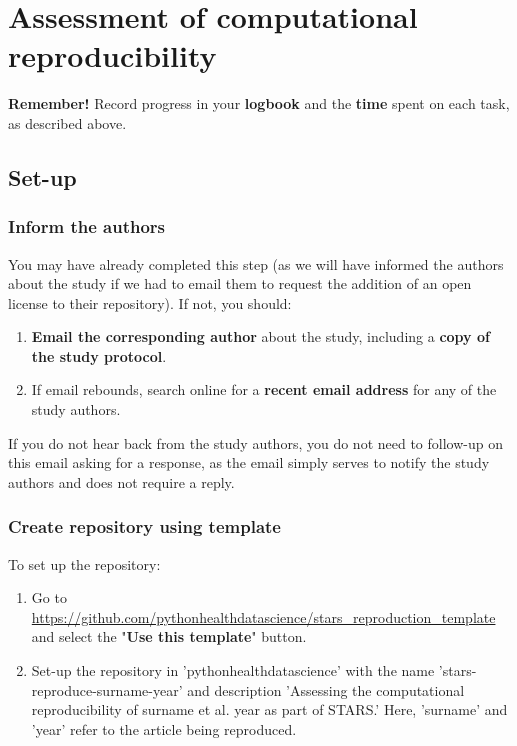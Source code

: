 \section{Assessment of computational reproducibility} \label{sec:reproduce}

\textbf{Remember!} Record progress in your \textbf{logbook} and the \textbf{time} spent on each task, as described above.

\vspace{0.5cm}
\subsection{Set-up}

\subsubsection{Inform the authors}

You may have already completed this step (as we will have informed the authors about the study if we had to email them to request the addition of an open license to their repository). If not, you should:
\begin{enumerate}
    \item \textbf{Email the corresponding author} about the study, including a \textbf{copy of the study protocol}.
    \item If email rebounds, search online for a \textbf{recent email address} for any of the study authors.
\end{enumerate}

If you do not hear back from the study authors, you do not need to follow-up on this email asking for a response, as the email simply serves to notify the study authors and does not require a reply.

\vspace{0.5cm}
\subsubsection{Create repository using template}

To set up the repository:

\begin{enumerate}
    \item Go to \url{https://github.com/pythonhealthdatascience/stars_reproduction_template} and select the "\textbf{Use this template}" button.
    \item Set-up the repository in 'pythonhealthdatascience' with the name 'stars-reproduce-surname-year' and description 'Assessing the computational reproducibility of surname et al. year as part of STARS.' Here, 'surname' and 'year' refer to the article being reproduced.
\end{enumerate}

